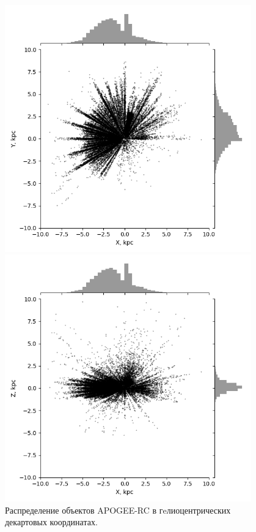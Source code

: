 \documentclass{matmex-diploma-custom}
\begin{document}
\begin{figure}[h!]
\begin{minipage}[h]{0.49\linewidth}
        \includegraphics[width=0.95\textwidth]{../imgs/XYobj.png}
\end{minipage}
\hfill
\begin{minipage}[h]{0.49\linewidth}
        \includegraphics[width=0.95\textwidth]{../imgs/XZobj.png}
\end{minipage}
\caption{Распределение объектов APOGEE-RC в гeлиоцентрических декартовых координатах.}
\end{figure}
\end{document}
